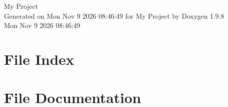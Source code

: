 \documentclass[twoside]{book}
\newcommand{\+}{\discretionary{\mbox{\scriptsize$\hookleftarrow$}}{}{}}
\newcommand{\clearemptydoublepage}{%
    \newpage{\pagestyle{empty}\cleardoublepage}%
  }
\begin{document}
  \raggedbottom
    \hypersetup{pageanchor=false,
                bookmarksnumbered=true,
                pdfencoding=unicode
               }
  \begin{titlepage}
  \vspace*{7cm}
  \begin{center}%
  {\Large My Project}\\
  \vspace*{1cm}
  {\large Generated on Mon Nov 9 2026 08\+:46\+:49 for My Project by Doxygen 1.9.8}\\
    \vspace*{0.5cm}
    {\small Mon Nov 9 2026 08:46:49}
  \end{center}
  \end{titlepage}
  \clearemptydoublepage
  \tableofcontents
  \clearemptydoublepage
  \hypersetup{pageanchor=true}

\chapter{File Index}

\chapter{File Documentation}


  \backmatter
  \newpage
  \clearemptydoublepage
  \printindex
\end{document}
